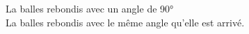 La balles rebondis avec un angle de \ang{90}
\\

La balles rebondis avec le même angle qu'elle est arrivé.
